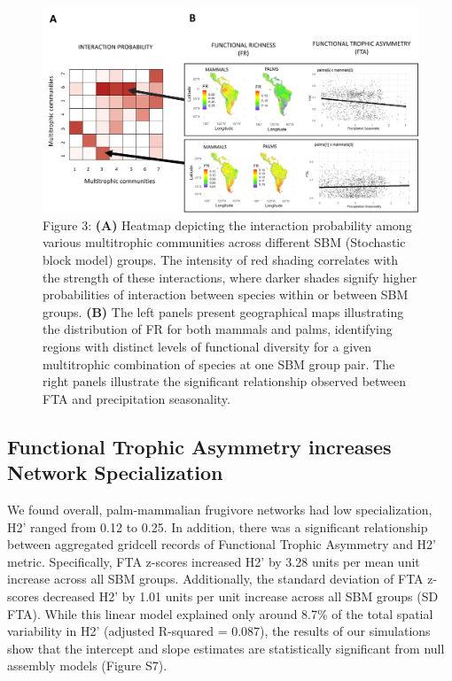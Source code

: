 \documentclass[
]{agujournal2019}
\begin{document}
\begin{figure}

{\centering \includegraphics{Main_figures/00_network_fr.png}

}

\caption{Figure 3: \textbf{(A)} Heatmap depicting the interaction
probability among various multitrophic communities across different SBM
(Stochastic block model) groups. The intensity of red shading correlates
with the strength of these interactions, where darker shades signify
higher probabilities of interaction between species within or between
SBM groups. \textbf{(B)} The left panels present geographical maps
illustrating the distribution of FR for both mammals and palms,
identifying regions with distinct levels of functional diversity for a
given multitrophic combination of species at one SBM group pair. The
right panels illustrate the significant relationship observed between
FTA and precipitation seasonality.}

\end{figure}%

\subsection{Functional Trophic Asymmetry increases Network
Specialization}\label{functional-trophic-asymmetry-increases-network-specialization}

We found overall, palm-mammalian frugivore networks had low
specialization, H2' ranged from 0.12 to 0.25. In addition, there was a
significant relationship between aggregated gridcell records of
Functional Trophic Asymmetry and H2' metric. Specifically, FTA z-scores
increased H2' by 3.28 units per mean unit increase across all SBM
groups. Additionally, the standard deviation of FTA z-scores decreased
H2' by 1.01 units per unit increase across all SBM groups (SD FTA).
While this linear model explained only around 8.7\% of the total spatial
variability in H2' (adjusted R-squared = 0.087), the results of our
simulations show that the intercept and slope estimates are
statistically significant from null assembly models (Figure S7).
\end{document}
